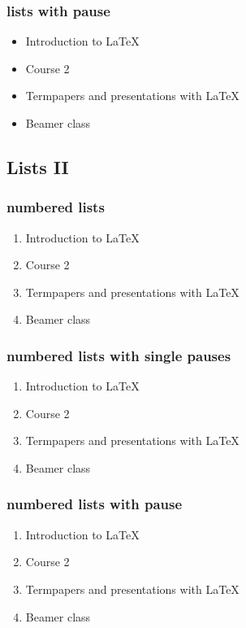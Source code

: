 \documentclass[hyperref={pdfpagelabels=false}]{beamer}
\begin{document}
    \begin{frame}\frametitle{lists with pause}
    \begin{itemize}[<+->]
    \item Introduction to  \LaTeX{}  
    \item Course 2
    \item Termpapers and presentations with \LaTeX{}  
    \item Beamer class
    \end{itemize} 
    \end{frame}
    
    
    
    \subsection{Lists II}
    \begin{frame}\frametitle{numbered lists}
    \begin{enumerate}
    \item Introduction to  \LaTeX{}   
    \item Course 2 
    \item Termpapers and presentations with \LaTeX{}  
    \item Beamer class
    \end{enumerate}
    \end{frame}
    
    \begin{frame}
    \frametitle{numbered lists with single pauses}
    \begin{enumerate}
    \item Introduction to  \LaTeX{}  \pause 
    \item Course 2 \pause 
    \item Termpapers and presentations with \LaTeX{}  \pause 
    \item Beamer class
    \end{enumerate}
    \end{frame}
    
    \begin{frame}
    \frametitle{numbered lists with pause}
    \begin{enumerate}[<+->]
    \item Introduction to  \LaTeX{}  
    \item Course 2
    \item Termpapers and presentations with \LaTeX{}  
    \item Beamer class
    \end{enumerate}
    \end{frame}
    
\end{document}
